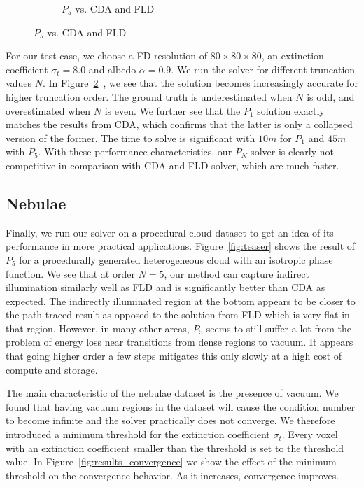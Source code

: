 \begin{figure}[h]
\begin{subfigure}{0.45\columnwidth}
\caption{$P_5$ vs. CDA and FLD}
\label{fig:pointsource_p5}
\end{subfigure}%
\vspace{-0.1in}
\label{fig:pointsource}
\end{figure}

For our test case, we choose a FD resolution of $80\times80\times80$, an extinction coefficient $\sigma_t=8.0$ and albedo $\alpha=0.9$. We run the solver for different truncation values $N$. In Figure~\ref{fig:pointsource}~, we see that the solution becomes increasingly accurate for higher truncation order. The ground truth is underestimated when $N$ is odd, and overestimated when $N$ is even. We further see that the $P_1$ solution exactly matches the results from CDA, which confirms that the latter is only a collapsed version of the former. The time to solve is significant with $10m$ for $P_1$ and $45m$ with $P_5$. With these performance characteristics, our $P_N$-solver is clearly not competitive in comparison with CDA and FLD solver, which are much faster.

\subsection{Nebulae}

Finally, we run our solver on a procedural cloud dataset to get an idea of its performance in more practical applications. Figure~\ref{fig:teaser} shows the result of $P_5$ for a procedurally generated heterogeneous cloud with an isotropic phase function. We see that at order $N=5$, our method can capture indirect illumination similarly well as FLD and is significantly better than CDA as expected. The indirectly illuminated region at the bottom appears to be closer to the path-traced result as opposed to the solution from FLD which is very flat in that region. However, in many other areas, $P_5$ seems to still suffer a lot from the problem of energy loss near transitions from dense regions to vacuum. It appears that going higher order a few steps mitigates this only slowly at a high cost of compute and storage.

The main characteristic of the nebulae dataset is the presence of vacuum. We found that having vacuum regions in the dataset will cause the condition number to become infinite and the solver practically does not converge. We therefore introduced a minimum threshold for the extinction coefficient $\sigma_t$. Every voxel with an extinction coefficient smaller than the threshold is set to the threshold value. In Figure~\ref{fig:results_convergence} we show the effect of the minimum threshold on the convergence behavior. As it increases, convergence improves.

